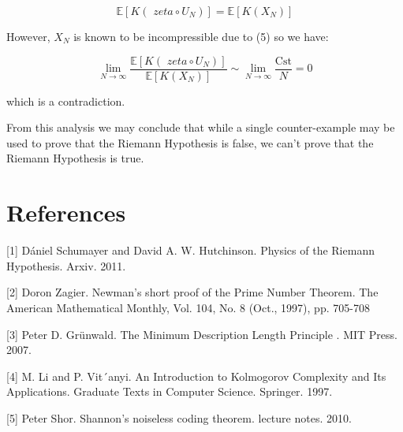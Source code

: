 \documentclass{article}
\begin{document}
\begin{equation}
\mathbb{E}[K(\textit{ zeta} \circ U_N)] = \mathbb{E}[K(X_N)]
\end{equation}

However, $X_N$ is known to be incompressible due to (5) so we have:

\begin{equation}
\lim_{N \to \infty} \frac{\mathbb{E}[K(\textit{ zeta} \circ U_N)]}{\mathbb{E}[K(X_N)]} \sim \lim_{N \to \infty} \frac{\text{Cst}}{N} = 0
\end{equation}

which is a contradiction.

From this analysis we may conclude that while a single counter-example may be used to prove that the Riemann Hypothesis is false, we can't prove that the Riemann Hypothesis is true. 

\section*{References}

\small

[1] Dániel Schumayer and David A. W. Hutchinson. Physics of the Riemann Hypothesis. Arxiv. 2011.

[2] Doron Zagier. Newman's short proof of the Prime Number Theorem. The American Mathematical Monthly, Vol. 104, No. 8 (Oct., 1997), pp. 705-708

[3] Peter D. Grünwald. The Minimum Description Length Principle
. MIT Press. 2007.

[4] M. Li and P. Vit´anyi. An Introduction to Kolmogorov Complexity and Its Applications. Graduate Texts in Computer Science. Springer. 1997.

[5] Peter Shor. Shannon’s noiseless coding theorem. lecture notes. 2010.
\end{document}
